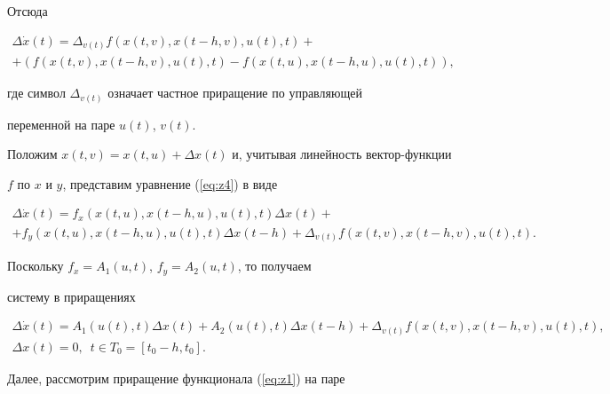 Отсюда


\begin{multline}


\Delta\Dot{x}(t) =\Delta_{v(t)} f(x(t,v),x(t-h,v),u(t),t)+\\


+(f(x(t,v),x(t-h,v),u(t),t)-f(x(t,u),x(t-h,u),u(t),t)),


\label{eq:z4}


\end{multline}


где символ $\Delta_{v(t)}$ означает частное приращение по управляющей


переменной на паре $u(t)$, $v(t)$.





Положим $x(t,v)=x(t,u)+\Delta x(t)$ и, учитывая линейность вектор-функции


$f$ по $x$ и $y$, представим уравнение (\ref{eq:z4}) в виде


\begin{multline*}


\Delta\Dot{x}(t)=f_x(x(t,u),x(t-h,u),u(t),t)\Delta x(t)+ \\


%


+f_y(x(t,u),x(t-h,u),u(t),t)\Delta x(t-h)


+\Delta_{v(t)}f(x(t,v),x(t-h,v),u(t),t).


\end{multline*}


Поскольку $f_x=A_1(u,t)$, $f_y=A_2(u,t)$, то получаем


систему в приращениях


\begin{equation}


\begin{array}{c}


\Delta\Dot{x}(t) = A_1(u(t),t)\Delta x(t) + A_2(u(t),t)\Delta x(t-h) +


\Delta_{v(t)} f(x(t,v),x(t-h,v),u(t),t), \\[3mm]


\Delta x(t)=0,\ \;t\in T_0=[t_0-h,t_0].


\end{array}


\label{eq:z5}


\end{equation}





Далее, рассмотрим приращение функционала (\ref{eq:z1}) на паре


